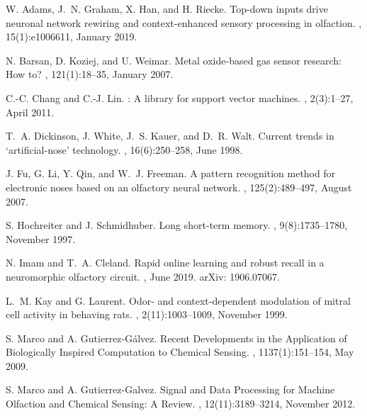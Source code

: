 \documentclass[onecolumn,pre,floats,aps,amsmath,amssymb,superscriptaddress]{revtex4-1}
\begin{document}
\begin{thebibliography}{10}

W. Adams, J.~N. Graham, X. Han, and H. Riecke.
\newblock Top-down inputs drive neuronal network rewiring and context-enhanced
  sensory processing in olfaction.
, 15(1):e1006611, January 2019.

N. Barsan, D. Koziej, and U. Weimar.
\newblock Metal oxide-based gas sensor research: {How} to?
, 121(1):18--35, January 2007.

C.-C. Chang and C.-J. Lin.
: {A} library for support vector machines.
,
  2(3):1--27, April 2011.

T.~A. Dickinson, J. White, J.~S. Kauer, and D.~R. Walt.
\newblock Current trends in `artificial-nose' technology.
, 16(6):250--258, June 1998.

J. Fu, G. Li, Y. Qin, and W.~J. Freeman.
\newblock A pattern recognition method for electronic noses based on an
  olfactory neural network.
, 125(2):489--497, August
  2007.

S. Hochreiter and J. Schmidhuber.
\newblock Long short-term memory.
, 9(8):1735--1780, November 1997.

N. Imam and T.~A. Cleland.
\newblock Rapid online learning and robust recall in a neuromorphic olfactory
  circuit.
, June 2019.
\newblock arXiv: 1906.07067.

L.~M. Kay and G. Laurent.
\newblock Odor- and context-dependent modulation of mitral cell activity in
  behaving rats.
, 2(11):1003--1009, November 1999.

S. Marco and A. Gutierrez‐Gálvez.
\newblock Recent {Developments} in the {Application} of {Biologically}
  {Inspired} {Computation} to {Chemical} {Sensing}.
, 1137(1):151--154, May 2009.

S. Marco and A. Gutierrez-Galvez.
\newblock Signal and {Data} {Processing} for {Machine} {Olfaction} and
  {Chemical} {Sensing}: {A} {Review}.
, 12(11):3189--3214, November 2012.


\end{thebibliography}
\end{document}
